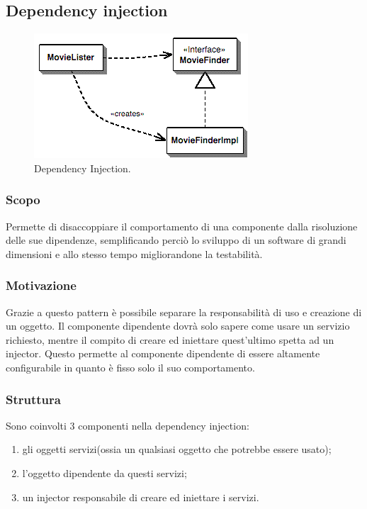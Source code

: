 
\subsection{Dependency injection}

\begin{figure} \label{fig:injector}
	\includegraphics[scale=0.5]{img/injector.png}
	\caption{Dependency Injection.}
\end{figure}

\subsubsection{Scopo} Permette di disaccoppiare il comportamento di una componente dalla risoluzione delle sue dipendenze, semplificando perciò lo sviluppo di un software di grandi dimensioni e allo stesso tempo migliorandone la testabilità.

\subsubsection{Motivazione} Grazie a questo pattern è possibile separare la responsabilità di uso e creazione di un oggetto. Il componente dipendente dovrà solo sapere come usare un servizio richiesto, mentre il compito di creare ed iniettare quest'ultimo spetta ad un injector. Questo permette al componente dipendente di essere altamente configurabile in quanto è fisso solo il suo comportamento.

\subsubsection{Struttura} Sono coinvolti 3 componenti nella dependency injection:
\begin{enumerate}
	\item gli oggetti servizi(ossia un qualsiasi oggetto che potrebbe essere usato);
	\item l'oggetto dipendente da questi servizi;
	\item un injector responsabile di creare ed iniettare i servizi.
\end{enumerate}

